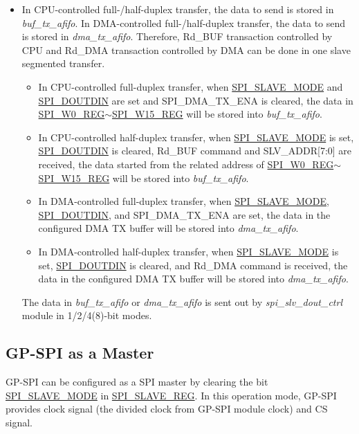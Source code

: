 \documentclass[main\_\_EN.tex]{subfiles}
\begin{document}
\begin{itemize}
\begin{itemize}
    \end{itemize}
    \item In CPU-controlled full-/half-duplex transfer, the data to send is stored in \textit{buf\_tx\_afifo}. In DMA-controlled full-/half-duplex transfer, the data to send is stored in \textit{dma\_tx\_afifo}. Therefore, Rd\_BUF transaction controlled by CPU and Rd\_DMA transaction controlled by DMA can be done in one slave segmented transfer.
    \begin{itemize}
        \item In CPU-controlled full-duplex transfer, when \hyperref[fielddesc:SPISLAVEMODE]{SPI\_SLAVE\_MODE} and \hyperref[fielddesc:SPIDOUTDIN]{SPI\_DOUTDIN} are set and SPI\_DMA\_TX\_ENA is cleared, the data in \hyperref[regdesc:SPIW0REG]{SPI\_W0\_REG}$\sim$\hyperref[regdesc:SPIW15REG]{SPI\_W15\_REG} will be stored into \textit{buf\_tx\_afifo}.
        \item In CPU-controlled half-duplex transfer, when \hyperref[fielddesc:SPISLAVEMODE]{SPI\_SLAVE\_MODE} is set, \hyperref[fielddesc:SPIDOUTDIN]{SPI\_DOUTDIN} is cleared, Rd\_BUF command and SLV\_ADDR[7:0] are received, the data started from the related address of \hyperref[regdesc:SPIW0REG]{SPI\_W0\_REG}$\sim$\hyperref[regdesc:SPIW15REG]{SPI\_W15\_REG} will be stored into \textit{buf\_tx\_afifo}.
        \item In DMA-controlled full-duplex transfer, when \hyperref[fielddesc:SPISLAVEMODE]{SPI\_SLAVE\_MODE}, \hyperref[fielddesc:SPIDOUTDIN]{SPI\_DOUTDIN}, and SPI\_DMA\_TX\_ENA are set, the data in the configured DMA TX buffer will be stored into \textit{dma\_tx\_afifo}.
        \item In DMA-controlled half-duplex transfer, when \hyperref[fielddesc:SPISLAVEMODE]{SPI\_SLAVE\_MODE} is set, \hyperref[fielddesc:SPIDOUTDIN]{SPI\_DOUTDIN} is cleared, and Rd\_DMA command is received, the data in the configured DMA TX buffer will be stored into \textit{dma\_tx\_afifo}.
    \end{itemize}

The data in \textit{buf\_tx\_afifo} or \textit{dma\_tx\_afifo} is sent out by \textit{spi\_slv\_dout\_ctrl} module in 1/2/4(8)-bit modes.
\end{itemize}

\subsection{GP-SPI as a Master}\label{sec:gp-spi2-master-mode}

GP-SPI can be configured as a SPI master by clearing the bit \hyperref[regdesc:SPISLAVEREG]{SPI\_SLAVE\_MODE} in \hyperref[fielddesc:SPISLAVEMODE]{SPI\_SLAVE\_REG}. In this operation mode, GP-SPI provides clock signal (the divided clock from GP-SPI module clock) and CS signal.
\end{document}
